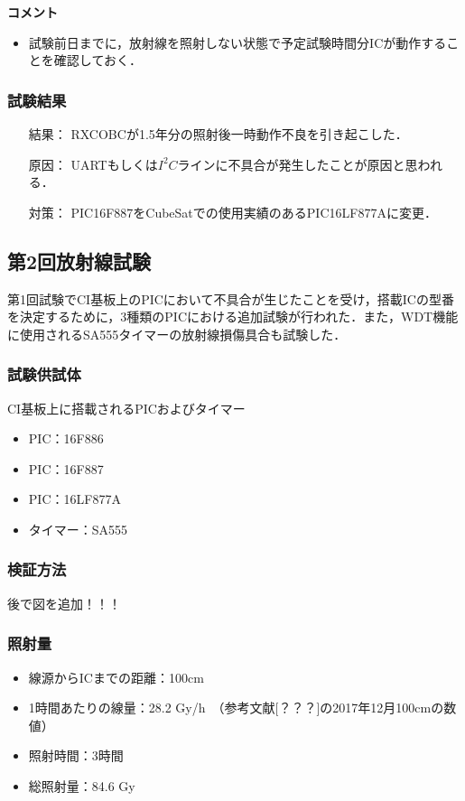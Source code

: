 \vspace{2ex} 
\textbf{コメント}
\begin{itemize}
	\item 試験前日までに，放射線を照射しない状態で予定試験時間分ICが動作することを確認しておく．
\end{itemize}

\subsubsection{試験結果}
\begin{itemize}
	\item[　結果：] RXCOBCが1.5年分の照射後一時動作不良を引き起こした．
	\item[　原因：] UARTもしくは$I^{2}C$ラインに不具合が発生したことが原因と思われる．
	\item[　対策：] PIC16F887をCubeSatでの使用実績のあるPIC16LF877Aに変更．
\end{itemize}

\subsection{第2回放射線試験}
第1回試験でCI基板上のPICにおいて不具合が生じたことを受け，搭載ICの型番を決定するために，3種類のPICにおける追加試験が行われた．また，WDT機能に使用されるSA555タイマーの放射線損傷具合も試験した．

\subsubsection{試験供試体}
CI基板上に搭載されるPICおよびタイマー
\begin{itemize}
	\item PIC：16F886
	\item PIC：16F887
	\item PIC：16LF877A
	\item タイマー：SA555
\end{itemize}

\subsubsection{検証方法}
後で図を追加！！！

\subsubsection{照射量}
\begin{itemize}
	\item 線源からICまでの距離：100cm
	\item 1時間あたりの線量：28.2 Gy/h　（参考文献[？？？]の2017年12月100cmの数値）
	\item 照射時間：3時間
	\item 総照射量：84.6 Gy
\end{itemize}

